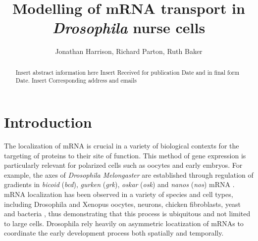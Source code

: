 \documentclass[twocolumn]{biophys}
\begin{document}
\setcounter{page}{1} %

\title{Modelling of mRNA transport in \textit{Drosophila} nurse cells}


\author{Jonathan Harrison, Richard Parton, Ruth Baker}

\address{University of Oxford}





\begin{abstract}%
{Insert abstract information here}%
{Insert Received for publication Date and in final form Date.}%
{Insert Corresponding address and emails}%
\end{abstract}

\maketitle %

\section{Introduction}

The localization of mRNA is crucial in a variety of biological contexts for the targeting of proteins to their site of function.
This method of gene expression is particularly relevant for polarized cells such as oocytes and early embryos.
For example, the axes of \textit{Drosophila Melongaster} are established through regulation of gradients in \textit{bicoid} (\textit{bcd}), \textit{gurken} (\textit{grk}), \textit{oskar} (\textit{osk}) and \textit{nanos} (\textit{nos}) mRNA \citep{wolpert1998}.
mRNA localization has been observed in a variety of species and cell types, including Drosophila and Xenopus oocytes, neurons, chicken fibroblasts, yeast and bacteria \citep{wilkie2001drosophila, bobola1996asymmetric, mowry1992vegetal, rosbash1993rna, nevo2011translation}, thus demonstrating that this process is ubiquitous and not limited to large cells. 
Drosophila rely heavily on asymmetric locatization of mRNAs to coordinate the early development process both spatially and temporally.
\end{document}
